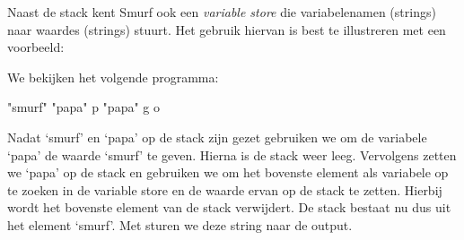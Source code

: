 Naast de stack kent Smurf ook een \emph{variable store} die variabelenamen
(strings) naar waardes (strings) stuurt. Het gebruik hiervan is best te
illustreren met een voorbeeld:

\begin{exmp}
	We bekijken het volgende programma:
	\begin{smurf}"smurf" "papa" p "papa" g o\end{smurf}
	Nadat `smurf' en `papa' op de stack zijn gezet gebruiken we 
	om de variabele `papa' de waarde `smurf' te geven. Hierna is de stack weer
	leeg. Vervolgens zetten we `papa' op de stack en gebruiken we 
	om het bovenste element als variabele op te zoeken in de variable store en de
	waarde ervan op de stack te zetten. Hierbij wordt het bovenste element van de
	stack verwijdert. De stack bestaat nu dus uit het element `smurf'. Met
	 sturen we deze string naar de output.
\end{exmp}




